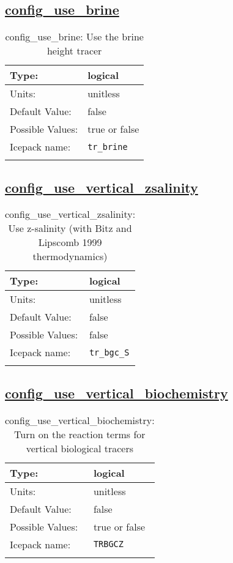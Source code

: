 \subsection[config\_use\_brine]{\hyperref[sec:nm_tab_biogeochemistry]{config\_use\_brine}}
\label{subsec:nm_sec_config_use_brine}
\begin{center}
\begin{longtable}{| p{2.0in} || p{4.0in} |}
    \hline
    Type: & logical \\
    \hline
    Units: & \si{unitless} \\
    \hline
    Default Value: & false \\
    \hline
    Possible Values: & true or false \\
    \hline
    Icepack name: & \verb+tr_brine+ \\
    \hline
    \caption{config\_use\_brine: Use the brine height tracer}
\end{longtable}
\end{center}
\subsection[config\_use\_vertical\_zsalinity]{\hyperref[sec:nm_tab_biogeochemistry]{config\_use\_vertical\_zsalinity}}
\label{subsec:nm_sec_config_use_vertical_zsalinity}
\begin{center}
\begin{longtable}{| p{2.0in} || p{4.0in} |}
    \hline
    Type: & logical \\
    \hline
    Units: & \si{unitless} \\
    \hline
    Default Value: & false \\
    \hline
    Possible Values: & false \\
    \hline
    Icepack name: & \verb+tr_bgc_S+ \\
    \hline
    \caption{config\_use\_vertical\_zsalinity: Use z-salinity (with Bitz and Lipscomb 1999 thermodynamics)}
\end{longtable}
\end{center}
\subsection[config\_use\_vertical\_biochemistry]{\hyperref[sec:nm_tab_biogeochemistry]{config\_use\_vertical\_biochemistry}}
\label{subsec:nm_sec_config_use_vertical_biochemistry}
\begin{center}
\begin{longtable}{| p{2.0in} || p{4.0in} |}
    \hline
    Type: & logical \\
    \hline
    Units: & \si{unitless} \\
    \hline
    Default Value: & false \\
    \hline
    Possible Values: & true or false \\
    \hline
    Icepack name: & \verb+TRBGCZ+ \\
    \hline
    \caption{config\_use\_vertical\_biochemistry: Turn on the reaction terms for vertical biological tracers}
\end{longtable}
\end{center}
